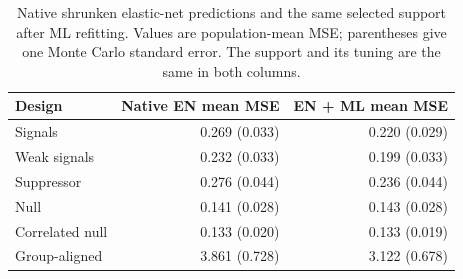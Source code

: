 \begin{table}[H]\centering\small
\begin{tabular}{lrr}
\toprule
Design & Native EN mean MSE & EN + ML mean MSE \\
\midrule
Signals & 0.269 (0.033) & 0.220 (0.029) \\
Weak signals & 0.232 (0.033) & 0.199 (0.033) \\
Suppressor & 0.276 (0.044) & 0.236 (0.044) \\
Null & 0.141 (0.028) & 0.143 (0.028) \\
Correlated null & 0.133 (0.020) & 0.133 (0.019) \\
Group-aligned & 3.861 (0.728) & 3.122 (0.678) \\
\bottomrule
\end{tabular}
\caption{Native shrunken elastic-net predictions and the same selected support after ML refitting. Values are population-mean MSE; parentheses give one Monte Carlo standard error. The support and its tuning are the same in both columns.}\label{tab:comparison_native}
\end{table}
